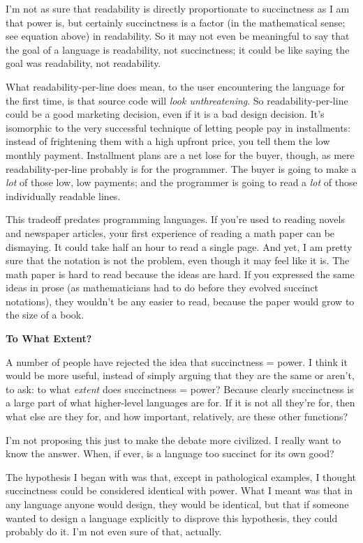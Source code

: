 I'm not as sure that readability is directly proportionate to
succinctness as I am that power is, but certainly succinctness is a
factor (in the mathematical sense; see equation above) in readability.
So it may not even be meaningful to say that the goal of a language is
readability, not succinctness; it could be like saying the goal was
readability, not readability.

What readability-per-line does mean, to the user encountering the
language for the first time, is that source code will \emph{look
unthreatening}. So readability-per-line could be a good marketing
decision, even if it is a bad design decision. It's isomorphic to the
very successful technique of letting people pay in installments: instead
of frightening them with a high upfront price, you tell them the low
monthly payment. Installment plans are a net lose for the buyer, though,
as mere readability-per-line probably is for the programmer. The buyer
is going to make a \emph{lot} of those low, low payments; and the
programmer is going to read a \emph{lot} of those individually readable
lines.

This tradeoff predates programming languages. If you're used to reading
novels and newspaper articles, your first experience of reading a math
paper can be dismaying. It could take half an hour to read a single
page. And yet, I am pretty sure that the notation is not the problem,
even though it may feel like it is. The math paper is hard to read
because the ideas are hard. If you expressed the same ideas in prose (as
mathematicians had to do before they evolved succinct notations), they
wouldn't be any easier to read, because the paper would grow to the size
of a book.

\textbf{To What Extent?}

A number of people have rejected the idea that succinctness = power. I
think it would be more useful, instead of simply arguing that they are
the same or aren't, to ask: to what \emph{extent} does succinctness =
power? Because clearly succinctness is a large part of what higher-level
languages are for. If it is not all they're for, then what else are they
for, and how important, relatively, are these other functions?

I'm not proposing this just to make the debate more civilized. I really
want to know the answer. When, if ever, is a language too succinct for
its own good?

The hypothesis I began with was that, except in pathological examples, I
thought succinctness could be considered identical with power. What I
meant was that in any language anyone would design, they would be
identical, but that if someone wanted to design a language explicitly to
disprove this hypothesis, they could probably do it. I'm not even sure
of that, actually.

